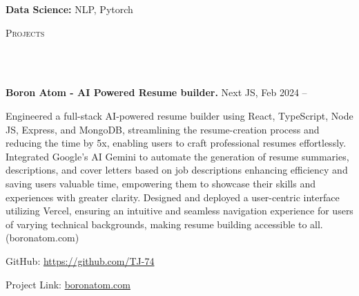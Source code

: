 \documentclass{article}
\newcommand{\project}[4]{{
  \vspace*{2pt}%
  \textbf{#1} #2 \hfill #3\\ #4 \vspace*{2pt}}
}
\newcommand{\lineunder}{
  \vspace*{-8pt} \\ \hspace*{-18pt} 
  \hrulefill \\
}
\newcommand{\header}[1]{{
  \hspace*{-15pt}\vspace*{6pt} \textsc{#1}} \vspace*{-6pt} 
  \lineunder
}
\renewcommand{\labelitemii}{
  $\vcenter{\hbox{\tiny$\bullet$}}$\hspace*{-3pt}
}
\newenvironment{bullet-list-major}{
  \begin{list}{\labelitemii}{\setlength\leftmargin{3pt} 
  \topsep 0pt \itemsep -2pt}}{\vspace*{4pt}\end{list}
}
\newenvironment{bullet-list-minor}{
  \begin{list}{\labelitemii}{\setlength\leftmargin{15pt} 
  \topsep 0pt \itemsep -2pt}}{\vspace*{4pt}\end{list}
}
\begin{document}
    \begin{bullet-list-major}
      \item \textbf{Data Science:} NLP, Pytorch
    \end{bullet-list-major}
  


  \header{Projects}
  
      \project{Boron Atom - AI Powered Resume builder.}{Next JS,}{
        Feb 2024 -- 
      }{
        \begin{bullet-list-minor}
          \item Engineered a full-stack AI-powered resume builder using React, TypeScript, Node JS, Express, and MongoDB, streamlining the resume-creation process and reducing the time by 5x, enabling users to craft professional resumes effortlessly.
Integrated Google's AI Gemini to automate the generation of resume summaries, descriptions, and cover letters based on job descriptions enhancing efficiency and saving users valuable time, empowering them to showcase their skills and experiences with greater clarity.
Designed and deployed a user-centric interface utilizing Vercel, ensuring an intuitive and seamless navigation experience for users of varying technical backgrounds, making resume building accessible to all. (boronatom.com)
          \item GitHub: \url{https://github.com/TJ-74}
          \item Project Link: \url{boronatom.com}
        \end{bullet-list-minor}
      }
    
\end{document}
